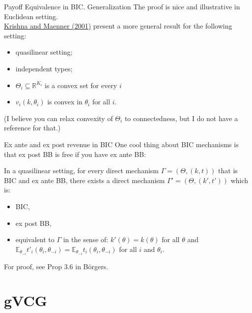 \documentclass[english,10pt
,aspectratio=169
]{beamer}
\begin{document}
\begin{frame}{Payoff Equivalence in BIC. Generalization}
	The proof is nice and illustrative in Euclidean setting.\\ \href{https://onlinelibrary.wiley.com/doi/abs/10.1111/1468-0262.00233}{\uline{Krishna and Maenner (2001)}} present a more general result for the following setting:
	\begin{itemize}
		\item quasilinear setting;
		\item independent types;
		\item $\Theta_i \subseteq \mathbb{R}^{K_i}$ is a convex set for every $i$ 
		\item $v_i(k,\theta_i)$ is convex in $\theta_i$ for all $i$.
	\end{itemize}
	(I believe you can relax convexity of $\Theta_i$ to connectedness, but I do not have a reference for that.)
\end{frame}


\begin{frame}{Ex ante and ex post revenue in BIC}
	One cool thing about BIC mechanisms is that ex post BB is free if you have ex ante BB:
	\begin{theorem}
		In a \alert{quasilinear} setting, for every direct mechanism $\Gamma = (\Theta, (k,t))$ that is BIC and \alert{ex ante BB}, there exists a direct mechanism $\Gamma' = (\Theta, (k',t'))$ which is:
		\begin{itemize}
			\item BIC,
			\item \alert{ex post BB},
			\item equivalent to $\Gamma$ in the sense of: $k'(\theta) = k(\theta)$ for all $\theta$ and $\mathbb{E}_{\theta_{-i}} t'_i(\theta_i,\theta_{-i}) = \mathbb{E}_{\theta_{-i}} t_i(\theta_i,\theta_{-i})$ for all $i$ and $\theta_i$.
		\end{itemize}
	\end{theorem}
	For proof, see Prop 3.6 in B{\"o}rgers.
\end{frame}


\section{gVCG}
\end{document}
